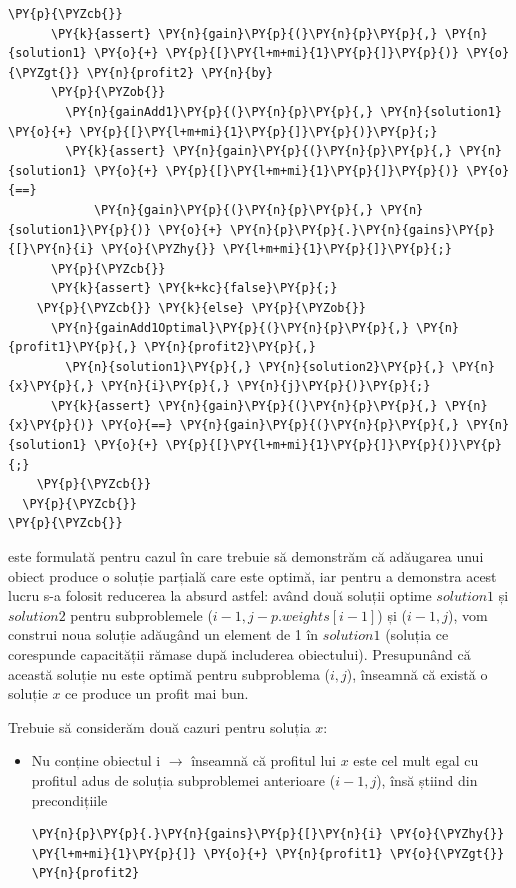 \begin{sloppypar}
\begin{enumerate}
\begin{Verbatim}[commandchars=\\\{\}]
      \PY{p}{\PYZcb{}}
      \PY{k}{assert} \PY{n}{gain}\PY{p}{(}\PY{n}{p}\PY{p}{,} \PY{n}{solution1} \PY{o}{+} \PY{p}{[}\PY{l+m+mi}{1}\PY{p}{]}\PY{p}{)} \PY{o}{\PYZgt{}} \PY{n}{profit2} \PY{n}{by} 
      \PY{p}{\PYZob{}}
        \PY{n}{gainAdd1}\PY{p}{(}\PY{n}{p}\PY{p}{,} \PY{n}{solution1} \PY{o}{+} \PY{p}{[}\PY{l+m+mi}{1}\PY{p}{]}\PY{p}{)}\PY{p}{;}
        \PY{k}{assert} \PY{n}{gain}\PY{p}{(}\PY{n}{p}\PY{p}{,} \PY{n}{solution1} \PY{o}{+} \PY{p}{[}\PY{l+m+mi}{1}\PY{p}{]}\PY{p}{)} \PY{o}{==} 
            \PY{n}{gain}\PY{p}{(}\PY{n}{p}\PY{p}{,} \PY{n}{solution1}\PY{p}{)} \PY{o}{+} \PY{n}{p}\PY{p}{.}\PY{n}{gains}\PY{p}{[}\PY{n}{i} \PY{o}{\PYZhy{}} \PY{l+m+mi}{1}\PY{p}{]}\PY{p}{;}
      \PY{p}{\PYZcb{}}
      \PY{k}{assert} \PY{k+kc}{false}\PY{p}{;} 
    \PY{p}{\PYZcb{}} \PY{k}{else} \PY{p}{\PYZob{}}
      \PY{n}{gainAdd1Optimal}\PY{p}{(}\PY{n}{p}\PY{p}{,} \PY{n}{profit1}\PY{p}{,} \PY{n}{profit2}\PY{p}{,} 
        \PY{n}{solution1}\PY{p}{,} \PY{n}{solution2}\PY{p}{,} \PY{n}{x}\PY{p}{,} \PY{n}{i}\PY{p}{,} \PY{n}{j}\PY{p}{)}\PY{p}{;}
      \PY{k}{assert} \PY{n}{gain}\PY{p}{(}\PY{n}{p}\PY{p}{,} \PY{n}{x}\PY{p}{)} \PY{o}{==} \PY{n}{gain}\PY{p}{(}\PY{n}{p}\PY{p}{,} \PY{n}{solution1} \PY{o}{+} \PY{p}{[}\PY{l+m+mi}{1}\PY{p}{]}\PY{p}{)}\PY{p}{;}
    \PY{p}{\PYZcb{}}
  \PY{p}{\PYZcb{}}
\PY{p}{\PYZcb{}}
\end{Verbatim}
     este formulată pentru cazul în care trebuie să demonstrăm că adăugarea unui obiect produce o soluție parțială care este optimă, iar pentru a demonstra acest lucru s-a folosit reducerea la absurd astfel: având două soluții optime $solution1$ și $solution2$ pentru subproblemele ($i - 1, j - p.weights[i - 1]$) și ($i - 1, j$), vom construi noua soluție adăugând un element de 1 în $solution1$ (soluția ce corespunde capacității rămase după includerea obiectului). Presupunând că această soluție nu este optimă pentru subproblema ($i, j$), înseamnă că există o soluție $x$ ce produce un profit mai bun. \par 
     \hspace{2mm} Trebuie să considerăm două cazuri pentru soluția $x$: 
     \begin{itemize}
         \item Nu conține obiectul i $\rightarrow$ înseamnă că profitul lui $x$ este cel mult egal cu profitul adus de soluția subproblemei anterioare ($i - 1, j$), însă știind din precondițiile 
         \begin{Verbatim}[commandchars=\\\{\}]
\PY{n}{p}\PY{p}{.}\PY{n}{gains}\PY{p}{[}\PY{n}{i} \PY{o}{\PYZhy{}} \PY{l+m+mi}{1}\PY{p}{]} \PY{o}{+} \PY{n}{profit1} \PY{o}{\PYZgt{}} \PY{n}{profit2}

\end{Verbatim}
\end{itemize}
\end{enumerate}
\end{sloppypar}
